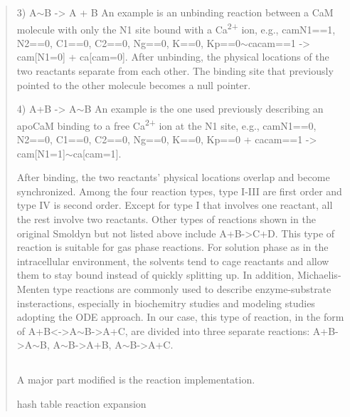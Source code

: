 \begin{quote}
3) A$\sim$B -> A + B
An example is an unbinding reaction between a CaM molecule with only the N1 site bound with a Ca\textsuperscript{2+} ion, e.g.,
cam{N1==1, N2==0, C1==0, C2==0, Ng==0, K==0, Kp==0}$\sim$ca{cam==1} -> cam[N1=0] + ca[cam=0].
After unbinding, the physical locations of the two reactants separate from each other. The binding site that previously pointed to the other molecule becomes a null pointer.

4) A+B -> A$\sim$B
An example is the one used previously describing an apoCaM binding to a free Ca\textsuperscript{2+} ion at the N1 site, e.g.,
cam{N1==0, N2==0, C1==0, C2==0, Ng==0, K==0, Kp==0} + ca{cam==1} -> cam[N1=1]$\sim$ca[cam=1].

After binding, the two reactants’ physical locations overlap and become synchronized.
Among the four reaction types, type I-III are first order and type IV is second order. Except for type I that involves one reactant, all the rest involve two reactants. Other types of reactions shown in the original Smoldyn but not listed above include A+B->C+D. This type of reaction is suitable for gas phase reactions. For solution phase as in the intracellular environment, the solvents tend to cage reactants and allow them to stay bound instead of quickly splitting up. In addition, Michaelis-Menten type reactions are commonly used to describe enzyme-substrate insteractions, especially in biochemitry studies and modeling studies adopting the ODE approach. In our case, this type of reaction, in the form of A+B<->A$\sim$B->A+C, are divided into three separate reactions:
A+B->A$\sim$B, A$\sim$B->A+B, A$\sim$B->A+C.

\subsection{}

A major part modified is the reaction implementation.

hash table
reaction expansion


\end{quote}
